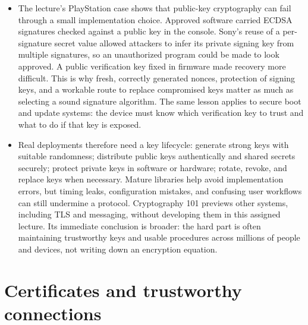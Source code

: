 \documentclass[10pt]{article}
\begin{document}
\begin{itemize}[leftmargin=1.25em, itemsep=0.3em, parsep=0pt, topsep=0pt]
    \item The lecture's PlayStation case shows that public-key cryptography can fail through a small implementation choice. Approved software carried ECDSA signatures checked against a public key in the console. Sony's reuse of a per-signature secret value allowed attackers to infer its private signing key from multiple signatures, so an unauthorized program could be made to look approved. A public verification key fixed in firmware made recovery more difficult. This is why fresh, correctly generated nonces, protection of signing keys, and a workable route to replace compromised keys matter as much as selecting a sound signature algorithm. The same lesson applies to secure boot and update systems: the device must know which verification key to trust and what to do if that key is exposed.

    \item Real deployments therefore need a key lifecycle: generate strong keys with suitable randomness; distribute public keys authentically and shared secrets securely; protect private keys in software or hardware; rotate, revoke, and replace keys when necessary. Mature libraries help avoid implementation errors, but timing leaks, configuration mistakes, and confusing user workflows can still undermine a protocol. Cryptography 101 previews other systems, including TLS and messaging, without developing them in this assigned lecture. Its immediate conclusion is broader: the hard part is often maintaining trustworthy keys and usable procedures across millions of people and devices, not writing down an encryption equation.
\end{itemize}

\section*{Certificates and trustworthy connections}
\end{document}
